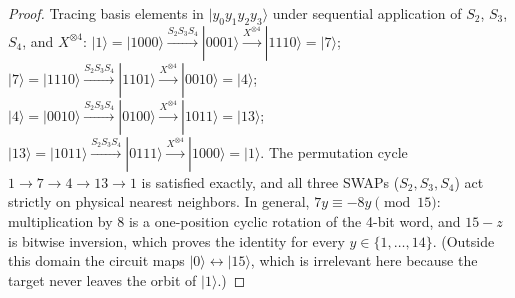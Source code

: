 \documentclass[11pt,a4paper,twocolumn]{article}
\newcommand{\ket}[1]{| #1 \rangle}
\begin{document}
\begin{proof}
Tracing basis elements in $\ket{y_0 y_1 y_2 y_3}$ under sequential application of $S_2$, $S_3$, $S_4$, and $X^{\otimes 4}$:
$\ket{1} = \ket{1000} \xrightarrow{S_2 S_3 S_4} \ket{0001} \xrightarrow{X^{\otimes 4}} \ket{1110} = \ket{7}$;
$\ket{7} = \ket{1110} \xrightarrow{S_2 S_3 S_4} \ket{1101} \xrightarrow{X^{\otimes 4}} \ket{0010} = \ket{4}$;
$\ket{4} = \ket{0010} \xrightarrow{S_2 S_3 S_4} \ket{0100} \xrightarrow{X^{\otimes 4}} \ket{1011} = \ket{13}$;
$\ket{13} = \ket{1011} \xrightarrow{S_2 S_3 S_4} \ket{0111} \xrightarrow{X^{\otimes 4}} \ket{1000} = \ket{1}$.
The permutation cycle $1 \to 7 \to 4 \to 13 \to 1$ is satisfied exactly, and all three SWAPs ($S_2, S_3, S_4$) act strictly on physical nearest neighbors. In general, $7y \equiv -8y \pmod{15}$: multiplication by $8$ is a one-position cyclic rotation of the 4-bit word, and $15 - z$ is bitwise inversion, which proves the identity for every $y \in \{1, \dots, 14\}$. (Outside this domain the circuit maps $\ket{0} \leftrightarrow \ket{15}$, which is irrelevant here because the target never leaves the orbit of $\ket{1}$.)
\end{proof}
\end{document}
